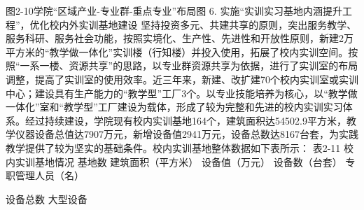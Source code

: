 图2-10学院“区域产业-专业群-重点专业”布局图
6. 实施“实训实习基地内涵提升工程”，优化校内外实训基地建设
坚持投资多元、共建共享的原则，突出服务教学、服务科研、服务社会功能，按照实境化、生产性、先进性和开放性原则，新建2万平方米的“教学做一体化”实训楼（行知楼）并投入使用，拓展了校内实训空间。按照“一系一楼、资源共享”的思路，以专业群资源共享为依据，进行了实训室的布局调整，提高了实训室的使用效率。近三年来，新建、改扩建70个校内实训室或实训中心；建设具有生产能力的“教学型”工厂3个。以专业技能培养为核心，以“教学做一体化”室和“教学型”工厂建设为载体，形成了较为完整和先进的校内实训实习体系。经过持续建设，学院现有校内实训基地164个，建筑面积达54502.9平方米，教学仪器设备总值达7907万元，新增设备值2941万元，设备总数达8167台套，为实践教学提供了较为坚实的基础条件。校内实训基地整体数据如下表所示：
表2-11 校内实训基地情况
基地数
建筑面积（平方米）
设备值（万元）
设备数（台套）
专职管理人员（名）



设备总数
大型设备


